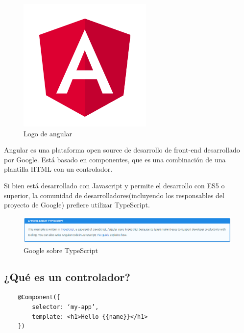 \documentclass[openright,twoside,10pt]{book}
\begin{document}
    \begin{figure}[H]
        \begin{center}
            \includegraphics[scale=0.6]{img/angular.png}
        \end{center}
        \caption{Logo de angular}
    \end{figure}
    
    Angular es una plataforma open source de desarrollo de front-end
    desarrollado por Google. Está basado en componentes, que es una
    combinación de una plantilla HTML con un controlador.
    
    Si bien está desarrollado con Javascript y permite el desarrollo con ES5
    o superior, la comunidad de desarrolladores(incluyendo los responsables
    del proyecto de Google) prefiere utilizar TypeScript.
    \cite{angular_docs}
    
    \begin{figure}[H]
        \begin{center}
            \includegraphics[width=\textwidth]{img/aboutTypescript.png}
        \end{center}
        \caption{Google sobre TypeScript}
    \end{figure}
    
    \subsection{¿Qué es un controlador?}\label{quuxe9-es-un-controlador}
    
    \begin{verbatim}
    @Component({
        selector: ‘my-app’,
        template: <h1>Hello {{name}}</h1>
    })
    \end{verbatim}
    
\end{document}
